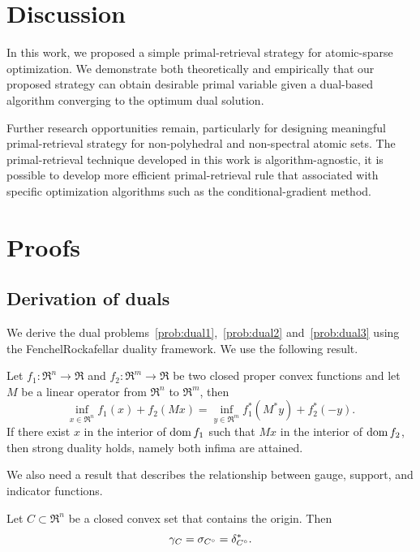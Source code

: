\section{Discussion}
In this work, we proposed a simple primal-retrieval strategy for atomic-sparse optimization. We demonstrate both theoretically and empirically that our proposed strategy can obtain desirable primal variable given a dual-based algorithm converging to the optimum dual solution. 

Further research opportunities remain, particularly for designing meaningful primal-retrieval strategy for non-polyhedral and non-spectral atomic sets. The primal-retrieval technique developed in this work is algorithm-agnostic, it is possible to develop more efficient primal-retrieval rule that associated with specific optimization algorithms such as the conditional-gradient method.


\section{Proofs}

\subsection{Derivation of duals}\label{app:duals}

We derive the dual problems~\eqref{prob:dual1},~\eqref{prob:dual2} and~\eqref{prob:dual3} using the Fenchel\textendash Rockafellar duality framework. We use the following result.
\begin{theorem}\label{thm-fenchel}
  Let $f_1:\Re^n\to\Re$ and $f_2:\Re^m\to\Re$ be two closed proper convex functions and let $M$ be a linear operator from $\Re^n$ to $\Re^m$, then
  \[\inf_{x \in \Re^n} f_1(x) + f_2(Mx) = \inf_{y \in \Re^m} f_1^*(M^*y) + f_2^*(-y).\]
  If there exist $x$ in the interior of $\operatorname{dom} f_1$ such that $Mx$ in the interior of $\operatorname{dom} f_2$, then strong duality holds, namely both infima are attained. 
\end{theorem}
We also need a result that describes the relationship between gauge, support, and indicator functions. 
\begin{proposition} \label{prop-conjugate-gauge}
  Let $C\subset\Re^n$ be a closed convex set that contains the origin. Then 
  \[\gamma_C = \sigma_{C^\circ}=\delta_{C^\circ}^*.\]
\end{proposition}

